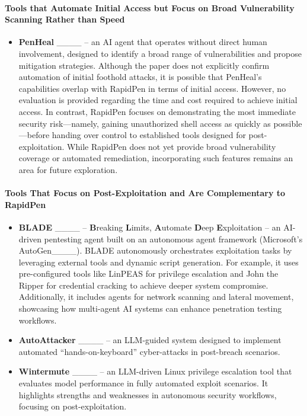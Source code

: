 \paragraph{Tools that Automate Initial Access but Focus on Broad Vulnerability Scanning Rather than Speed}
\begin{itemize}
    \item \textbf{PenHeal} ____ – an AI agent that operates without direct human involvement, designed to identify a broad range of vulnerabilities and propose mitigation strategies. Although the paper does not explicitly confirm automation of initial foothold attacks, it is possible that PenHeal’s capabilities overlap with RapidPen in terms of initial access. However, no evaluation is provided regarding the time and cost required to achieve initial access. In contrast, RapidPen focuses on demonstrating the most immediate security risk—namely, gaining unauthorized shell access as quickly as possible—before handing over control to established tools designed for post-exploitation. While RapidPen does not yet provide broad vulnerability coverage or automated remediation, incorporating such features remains an area for future exploration.
\end{itemize}

\paragraph{Tools That Focus on Post-Exploitation and Are Complementary to RapidPen}
\begin{itemize}
    \item \textbf{BLADE} ____ – \textbf{B}reaking \textbf{L}imits, \textbf{A}utomate \textbf{D}eep \textbf{E}xploitation – an AI-driven pentesting agent built on an autonomous agent framework (Microsoft’s AutoGen____). BLADE autonomously orchestrates exploitation tasks by leveraging external tools and dynamic script generation. For example, it uses pre-configured tools like LinPEAS for privilege escalation and John the Ripper for credential cracking to achieve deeper system compromise. Additionally, it includes agents for network scanning and lateral movement, showcasing how multi-agent AI systems can enhance penetration testing workflows.
    \item \textbf{AutoAttacker} ____ – an LLM-guided system designed to implement automated “hands-on-keyboard” cyber-attacks in post-breach scenarios.
    \item \textbf{Wintermute} ____ – an LLM-driven Linux privilege escalation tool that evaluates model performance in fully automated exploit scenarios. It highlights strengths and weaknesses in autonomous security workflows, focusing on post-exploitation.
\end{itemize}

